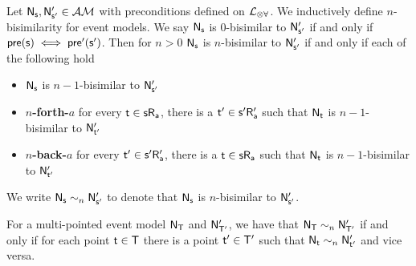 
\begin{defn} \label{nBisimEvent}
	Let $\aMod{\evMo_s, \evMo'_{s'}} \in \eventClass$ with preconditions defined on $\langArbAct$.
	We inductively define $n$-bisimilarity for event models.
	We say $\aMod{\evMo_s}$ is $0$-bisimilar to $\aMod{\evMo'_{s'}}$ if and only if $\aMod{pre(s) \iff
		pre'(s')}$.
	Then for $n > 0$ $\aMod{\evMo_s}$ is $n$-bisimilar to $\aMod{\evMo'_{s'}}$ if and only if each of the following hold
	\begin{itemize}
		\item $\aMod{\evMo_s}$ is $n-1$-bisimilar to $\aMod{\evMo'_{s'}}$
		\item {\bf $n$-forth-$a$} for every $\aMod{t \in s R_a}$, there is a $\aMod{t' \in s' R'_a}$
		such that $\aMod{\evMo_t}$ is
		$n-1$-bisimilar to $\aMod{\evMo'_{t'}}$
		\item {\bf $n$-back-$a$} for every $\aMod{t' \in s' R'_a}$, there is a $\aMod{t \in s R_a}$ such
		that $\aMod{\evMo_t}$ is
		$n-1$-bisimilar to $\aMod{\evMo'_{t'}}$
	\end{itemize}
	We write $\evMo_\evs \sim_n \evMo'_{\evs'}$ to denote that $\evMo_\evs$ is $n$-bisimilar to
	$\evMo'_{\evs'}$.
\end{defn}

For a multi-pointed event model $\aMod{\evMo_T}$ and $\aMod{\evMo'_{T'}}$, we have that $\evMo_\evT \sim_n
\evMo'_{\evT'}$ if and only if for each point $\evt \in \evT$ there is a point $\evt' \in \evT'$
such that $\evMo_\evt \sim_n \evMo'_{\evt'}$ and vice versa.

